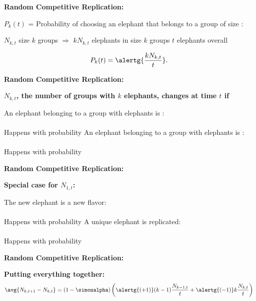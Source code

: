   \textbf{Random Competitive Replication:}

  
  $P_k(t)$ = Probability of choosing an elephant that belongs
  to a group of size :

  
    $N_{k,t}$ size $k$ groups
    $\Rightarrow$ $kN_{k,t}$ elephants in size $k$ groups
    $t$ elephants overall
  
  {
    $$ P_k(t) = \alertg{\frac{k N_{k,t}}{ t}}.$$
  }
  


  \textbf{Random Competitive Replication:}

  \textbf{$N_{k,t}$, the number of groups with $k$ elephants, changes at time $t$ if}
    
     An elephant belonging to a group with  elephants is :\\
      {}\\
      {Happens with probability }
      \bigskip
     An elephant belonging to a group with  elephants is :\\
      {}\\
      {Happens with probability }
    
  


  \textbf{Random Competitive Replication:}

  \textbf{Special case for $N_{1,t}$:}
    
     The new elephant is a new flavor:\\
      {}\\
      {Happens with probability \alertg{$\simonalpha$}}
      \bigskip
     A unique elephant is replicated:\\
      {}\\
      {Happens with probability }
    
  


  \textbf{Random Competitive Replication:}

  \textbf{Putting everything together:}
  {  
    $$
    \avg{N_{k,t+1} - N_{k,t}}
    =
    (1-\simonalpha)
    \left(
      \alertg{(+1)}
      (k-1)\frac{N_{k-1,t}}{t}
      +
      \alertg{(-1)}
      k\frac{N_{k,t}}{t}
    \right)
    $$
  }
  

  \bigskip

